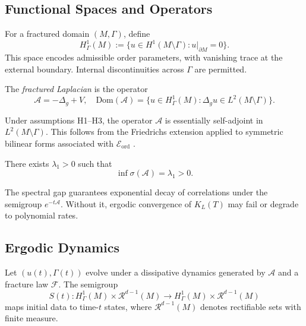 \subsection{Functional Spaces and Operators}

\begin{definition}
For a fractured domain $(M,\Gamma)$, define
\[
H^1_\Gamma(M) := \{ u \in H^1(M\setminus \Gamma) : u|_{\partial M} = 0 \}.
\]
This space encodes admissible order parameters, with vanishing trace
at the external boundary. Internal discontinuities across $\Gamma$
are permitted.
\end{definition}

\begin{definition}
The \emph{fractured Laplacian} is the operator
\[
\mathcal{A} = -\Delta_g + V, \quad
\mathrm{Dom}(\mathcal{A}) = \{ u \in H^1_\Gamma(M): \Delta_g u \in L^2(M\setminus\Gamma) \}.
\]
\end{definition}

\begin{remark}
Under assumptions H1–H3, the operator $\mathcal{A}$ is essentially
self-adjoint in $L^2(M\setminus \Gamma)$. This follows from the
Friedrichs extension applied to symmetric bilinear forms associated
with $\mathcal{E}_{\mathrm{ord}}$ \cite{kato1995perturbation}.
\end{remark}

\begin{assumption}
There exists $\lambda_1>0$ such that
\[
\inf \sigma(\mathcal{A}) = \lambda_1 > 0.
\]
\end{assumption}

\begin{remark}[Role of H4]
The spectral gap guarantees exponential decay of correlations under
the semigroup $e^{-t\mathcal{A}}$. Without it, ergodic convergence
of $K_L(T)$ may fail or degrade to polynomial rates.
\end{remark}

\bigskip


\subsection{Ergodic Dynamics}

\begin{definition}
Let $(u(t), \Gamma(t))$ evolve under a dissipative dynamics generated
by $\mathcal{A}$ and a fracture law $\mathcal{F}$. The semigroup
\[
S(t): H^1_\Gamma(M) \times \mathcal{R}^{d-1}(M) \to
H^1_\Gamma(M) \times \mathcal{R}^{d-1}(M)
\]
maps initial data to time-$t$ states, where $\mathcal{R}^{d-1}(M)$
denotes rectifiable sets with finite measure.
\end{definition}

